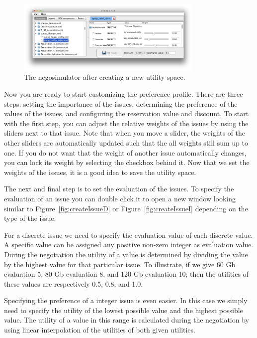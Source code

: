 \documentclass[]{article}
\begin{document}
\begin{figure}[htb]
	\centering
	\includegraphics[width=0.8\textwidth]{media/laptop.png}
\caption{The negosimulator after creating a new utility space.}\label{fig:utilcreated}
\end{figure}

Now you are ready to start customizing the preference profile. There are three steps: setting the importance of the issues, determining the preference of the values of the issues, and configuring the reservation value and discount. To start with the first step, you can adjust the relative weights of the issues by using the sliders next to that issue. Note that when you move a slider, the weights of the other sliders are automatically updated such that the all weights still sum up to one. If you do not want that the weight of another issue automatically changes, you can lock its weight by selecting the checkbox behind it. Now that we set the weights of the issues, it is a good idea to save the utility space.

The next and final step is to set the evaluation of the issues. To specify the evaluation of an issue you can double click it to open a new window looking similar to Figure~\ref{fig:createIssueD} or Figure~\ref{fig:createIssueI} depending on the type of the issue.

For a discrete issue we need to specify the evaluation value of each discrete value. A specific value can be assigned any positive non-zero integer as evaluation value. During the negotiation the utility of a value is determined by dividing the value by the highest value for that particular issue. To illustrate, if we give 60 Gb evaluation 5, 80 Gb evaluation 8, and 120 Gb evaluation 10; then the utilities of these values are respectively 0.5, 0.8, and 1.0.

Specifying the preference of a integer issue is even easier. In this case we simply need to specify the utility of the lowest possible value and the highest possible value. The utility of a value in this range is calculated during the negotiation by using linear interpolation of the utilities of both given utilities.
\end{document}
